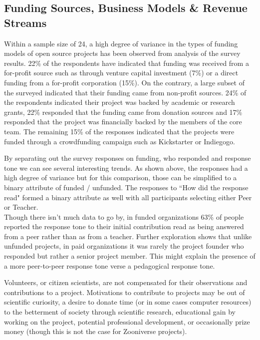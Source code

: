 \subsection{Funding Sources, Business Models \& Revenue Streams}

Within a sample size of 24, a high degree of variance in the types of funding models of open source projects has been observed from analysis of the survey results. 22\% of the respondents have indicated that funding was received from a for-profit source such as through venture capital investment (7\%) or a direct funding from a for-profit corporation (15\%). On the contrary, a large subset of the surveyed indicated that their funding came from non-profit sources. 24\% of the respondents indicated their project was backed by academic or research grants, 22\% responded that the funding came from donation sources and 17\% responded that the project was financially backed by the members of the core team. The remaining 15\% of the responses indicated that the projects were funded through a crowdfunding campaign such as Kickstarter or Indiegogo.





\noindent By separating out the survey responses on funding, who responded and response tone we can see several interesting trends. As shown above, the responses had a high degree of variance but for this comparison, those can be simplified to a binary attribute of funded / unfunded. The responses to ``How did the response read" formed a binary attribute as well with all participants selecting either Peer or Teacher.\\

\noindent Though there isn't much data to go by, in funded organizations 63\% of people reported the response tone to their initial contribution read as being answered from a peer rather than as from a teacher. Further exploration shows that unlike unfunded projects, in paid organizations it was rarely the project founder who responded but rather a senior project member. This might explain the presence of a more peer-to-peer response tone verse a pedagogical response tone.


\noindent Volunteers, or citizen scientists, are not compensated for their observations and contributions to a project. Motivations to contribute to projects may be out of scientific curiosity, a desire to donate time (or in some cases computer resources) to the betterment of society through scientific research, educational gain by working on the project, potential professional development, or occasionally prize money (though this is not the case for Zooniverse projects).\\

